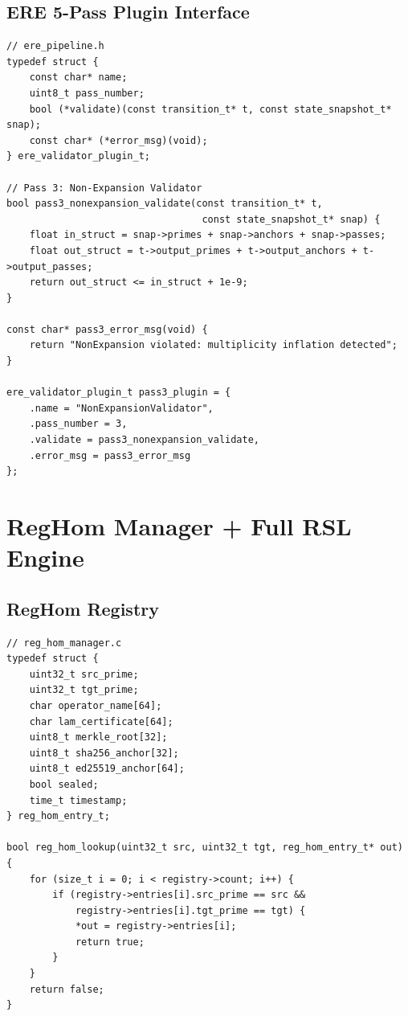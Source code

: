 \documentclass[11pt,a4paper]{article}
\begin{document}
\subsection{ERE 5-Pass Plugin Interface}

\begin{lstlisting}[caption={ERE Validator Plugin Interface}, label=lst:ere]
// ere_pipeline.h
typedef struct {
    const char* name;
    uint8_t pass_number;
    bool (*validate)(const transition_t* t, const state_snapshot_t* snap);
    const char* (*error_msg)(void);
} ere_validator_plugin_t;

// Pass 3: Non-Expansion Validator
bool pass3_nonexpansion_validate(const transition_t* t, 
                                  const state_snapshot_t* snap) {
    float in_struct = snap->primes + snap->anchors + snap->passes;
    float out_struct = t->output_primes + t->output_anchors + t->output_passes;
    return out_struct <= in_struct + 1e-9;
}

const char* pass3_error_msg(void) {
    return "NonExpansion violated: multiplicity inflation detected";
}

ere_validator_plugin_t pass3_plugin = {
    .name = "NonExpansionValidator",
    .pass_number = 3,
    .validate = pass3_nonexpansion_validate,
    .error_msg = pass3_error_msg
};
\end{lstlisting}

\section{RegHom Manager + Full RSL Engine}

\subsection{RegHom Registry}

\begin{lstlisting}[caption={RegHom Morphism Registry}, label=lst:reghom]
// reg_hom_manager.c
typedef struct {
    uint32_t src_prime;
    uint32_t tgt_prime;
    char operator_name[64];
    char lam_certificate[64];
    uint8_t merkle_root[32];
    uint8_t sha256_anchor[32];
    uint8_t ed25519_anchor[64];
    bool sealed;
    time_t timestamp;
} reg_hom_entry_t;

bool reg_hom_lookup(uint32_t src, uint32_t tgt, reg_hom_entry_t* out) {
    for (size_t i = 0; i < registry->count; i++) {
        if (registry->entries[i].src_prime == src && 
            registry->entries[i].tgt_prime == tgt) {
            *out = registry->entries[i];
            return true;
        }
    }
    return false;
}
\end{lstlisting}
\end{document}
